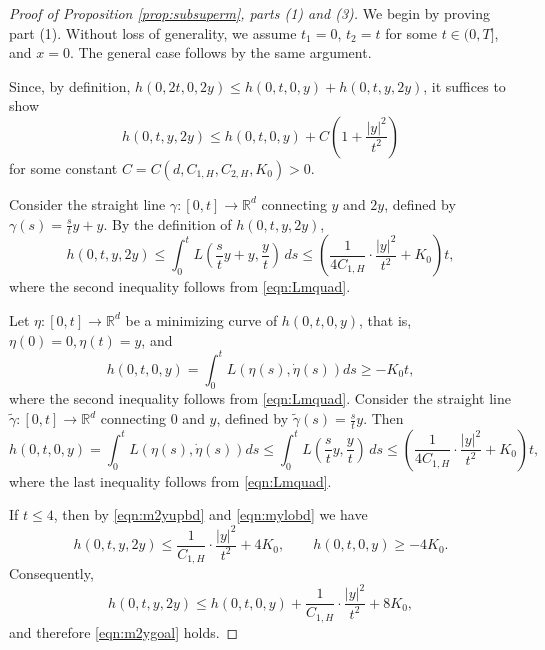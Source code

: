 \documentclass[reqno,11pt]{amsart}
\numberwithin{equation}{section}
\newcommand{\R}{\mathbb{R}} %
\begin{document}
\begin{proof}[Proof of Proposition \ref{prop:subsuperm}, parts (1) and (3)]
We begin by proving part (1). Without loss of generality, we assume
$t_1=0$, $t_2=t$ for some $t\in(0,T]$, and $x=0$. The general case
follows by the same argument.

Since, by definition, $h(0,2t, 0, 2y) \leq h(0,t,0,y)+h(0,t,y,2y)$, it suffices to show
\begin{equation}\label{eqn:m2ygoal}
h(0,t,y,2y) \leq h(0,t,0,y)+C\left(1+\frac{|y|^2}{t^2}\right)
\end{equation}
for some constant $C=C(d, C_{1, H}, C_{2, H}, K_0)>0$.

Consider the straight line $\gamma:[0,t]\to \R^d$ connecting $y$ and $2y$, defined by $\gamma(s)=\frac{s}{t}y+y$. By the definition of $h(0,t,y,2y)$,
\begin{equation}\label{eqn:m2yupbd}
    h(0,t,y,2y) \leq \int_0^t L\left(\frac{s}{t}y+y, \frac{y}{t}\right) \, ds \leq \left(\frac{1}{4C_{1,H}} \cdot \frac{|y|^2}{t^2}+K_0\right)t,
\end{equation}
where the second inequality follows from \eqref{eqn:Lmquad}.


Let $\eta:[0,t] \to \R^d$ be a minimizing curve of $h(0,t,0, y)$, that is, $\eta(0)=0, \eta(t)=y$, and
\begin{equation}\label{eqn:mylobd}
h(0,t,0,y)=\int_0^t L \left(\eta(s), \dot{\eta}(s)\right)ds \geq -K_0t,
\end{equation}
where the second inequality follows from \eqref{eqn:Lmquad}. Consider the straight line $\tilde{\gamma}:[0, t] \to \R^d$ connecting $0$ and $y$, defined by $\tilde{\gamma}(s)=\frac{s}{t}y$. Then
\begin{equation}\label{eqn:myupbd}
h(0,t,0,y)=\int_0^t L \left(\eta(s), \dot{\eta}(s)\right)ds \leq \int_0^t L\left(\frac{s}{t}y, \frac{y}{t}\right) \, ds \leq \left(\frac{1}{4C_{1,H}} \cdot \frac{|y|^2}{t^2}+K_0\right)t,
\end{equation}
where the last inequality follows from \eqref{eqn:Lmquad}.

If $t \leq 4$, then by \eqref{eqn:m2yupbd} and \eqref{eqn:mylobd} we have
\[
h(0,t,y,2y) \leq \frac{1}{C_{1,H} }\cdot \frac{|y|^2}{t^2}+4K_0, \qquad h(0,t,0,y) \geq -4K_0.
\]
Consequently,
\[
h(0,t,y,2y) \leq h(0,t, 0,y) +\frac{1}{C_{1,H} }\cdot \frac{|y|^2}{t^2}+8K_0,
\]
and therefore \eqref{eqn:m2ygoal} holds.


\end{proof}
\end{document}
